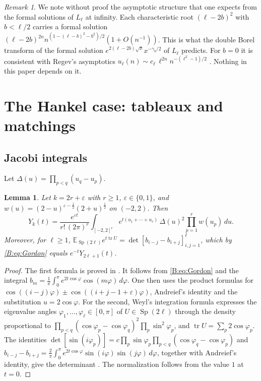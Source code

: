 \documentclass[11pt,a4paper]{article}
\newtheorem{lemma}[theorem]{Lemma}
\theoremstyle{definition}
\theoremstyle{remark}
\newtheorem{remark}[theorem]{Remark}
\newcommand{\E}{\mathbb E}
\DeclareMathOperator{\tr}{tr}
\DeclareMathOperator{\Sp}{Sp}
\numberwithin{equation}{section}
\begin{document}
\begin{remark}\label{B:rem:asymp}
We note without proof the asymptotic structure that one expects from the formal solutions of $L_\ell$ at infinity. Each characteristic root $(\ell-2b)^2$ with $b<\ell/2$ carries a formal solution $(\ell-2b)^{2n}n^{(1-(\ell-b)^2-b^2)/2}(1+O(n^{-1}))$. This is what the double Borel transform of the formal solution $e^{2(\ell-2b)\sqrt x}x^{-\gamma_b/2}$ of $L_\ell$ predicts. For $b=0$ it is consistent with Regev's asymptotics $u_\ell(n)\sim c_\ell\,\ell^{2n}n^{-(\ell^2-1)/2}$ \cite{Reg81}. Nothing in this paper depends on it.
\end{remark}

\section{The Hankel case: tableaux and matchings}\label{B:sec:CD}

\subsection{Jacobi integrals}
Let $\Delta(u)=\prod_{p<q}(u_q-u_p)$.

\begin{lemma}\label{B:lem:jacobi-int}
Let $k=2r+\varepsilon$ with $r\ge1$, $\varepsilon\in\{0,1\}$, and $w(u)=(2-u)^{\varepsilon-\frac12}(2+u)^{\frac12}$ on $(-2,2)$. Then
\[
Y_k(t)=\frac{e^{\varepsilon t}}{r!\,(2\pi)^r}\int_{[-2,2]^r}e^{t(u_1+\cdots+u_r)}\,\Delta(u)^2\prod_{p=1}^rw(u_p)\,du .
\]
Moreover, for $\ell\ge1$, $\E_{\Sp(2\ell)}e^{t\tr U}=\det[b_{i-j}-b_{i+j}]_{i,j=1}^{\ell}$, which by \eqref{B:eq:Gordon} equals $e^{-t}Y_{2\ell+1}(t)$.
\end{lemma}

\begin{proof}
The first formula is proved in \cite[Part~I]{Kei26}. It follows from \eqref{B:eq:Gordon} and the integral $b_m=\frac1\pi\int_0^\pi e^{2t\cos\varphi}\cos(m\varphi)\,d\varphi$. One then uses the product formulas for $\cos((i-j)\varphi)\pm\cos((i+j-1+\varepsilon)\varphi)$, Andreief's identity and the substitution $u=2\cos\varphi$. For the second, Weyl's integration formula expresses the eigenvalue angles $\varphi_1,\dots,\varphi_\ell\in[0,\pi]$ of $U\in\Sp(2\ell)$ through the density proportional to $\prod_{p<q}(\cos\varphi_p-\cos\varphi_q)^2\prod_p\sin^2\varphi_p$, and $\tr U=\sum_p2\cos\varphi_p$. The identities $\det[\sin(i\varphi_p)]=c\prod_p\sin\varphi_p\prod_{p<q}(\cos\varphi_q-\cos\varphi_p)$ and $b_{i-j}-b_{i+j}=\frac2\pi\int_0^\pi e^{2t\cos\varphi}\sin(i\varphi)\sin(j\varphi)\,d\varphi$, together with Andreief's identity, give the determinant \cite{BR01,Joh97}. The normalization follows from the value $1$ at $t=0$.
\end{proof}
\end{document}
